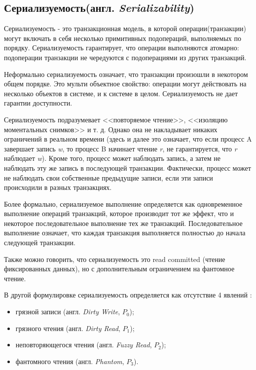 \documentclass[12pt,  openany]{book}
\begin{document}
\subsection{Сериализуемость(англ.  \textit{Serializability})}
Сериализуемость - это транзакционная модель, в которой операции(транзакции) могут включать в себя несколько примитивных подопераций, выполняемых по порядку. Сериализуемость гарантирует, что операции выполняются атомарно: подоперации транзакции не чередуются с подоперациями из других транзакций.
\par
Неформально сериализуемость означает, что транзакции произошли в некотором общем порядке.
Это мульти объектное свойство: операции могут действовать на несколько объектов в системе, и к системе в целом. Сериализуемость не дает гарантии доступности.
\par
Сериализуемость подразумевает <<повторяемое чтение>>, <<изоляцию моментальных снимков>> и т. д. Однако она не накладывает никаких ограничений в реальном времени (здесь и далее это означает, что если процесс A завершает запись \textit{w}, то процесс B начинает чтение \textit{r}, не гарантируется, что \textit{r} наблюдает \textit{w}).
Кроме того, процесс может наблюдать запись, а затем не наблюдать эту же запись в последующей транзакции. Фактически, процесс может не наблюдать свои собственные предыдущие записи, если эти записи происходили в разных транзакциях.
\par
Более формально, сериализуемое выполнение определяется как одновременное выполнение операций транзакций, которое производит тот же эффект, что и некоторое последовательное выполнение тех же транзакций. Последовательное выполнение означает, что каждая транзакция выполняется полностью до начала следующей транзакции.
\par
Также можно говорить, что сериализуемость это read committed (чтение фиксированных данных), но с дополнительным ограничением на фантомное чтение.
\par
В другой формулировке сериализуемость определяется как отсутствие 4 явлений \cite{adya99:_weak_consis}:
\begin{itemize}
  \item грязной записи (англ.  \textit{Dirty Write},  $P_0$);
  \item грязного чтения (англ. \textit{Dirty Read}, $P_1$);
  \item неповторяющегося чтения (англ. \textit{Fuzzy Read}, $P_2$);
  \item фантомного чтения (англ. \textit{Phantom}, $P_3$).
\end{itemize}
\end{document}

